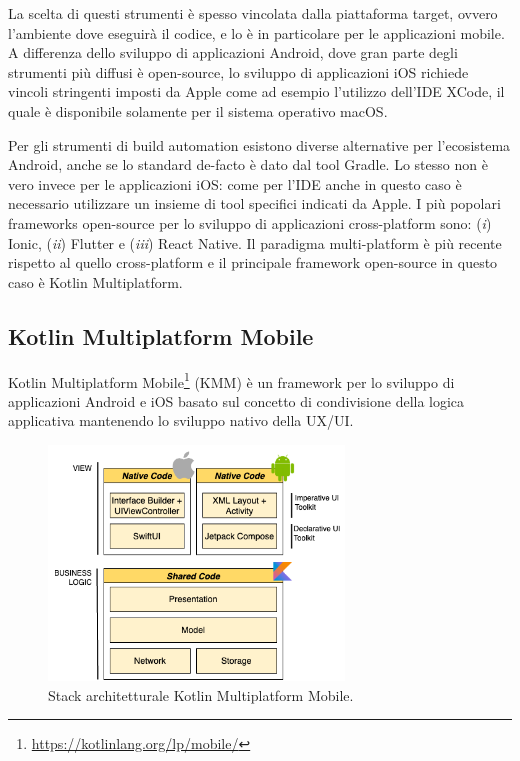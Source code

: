 La scelta di questi strumenti è spesso vincolata dalla piattaforma target, ovvero l'ambiente dove eseguirà il codice, e lo è in particolare per le applicazioni mobile. A differenza dello sviluppo di applicazioni Android, dove gran parte degli strumenti più diffusi è open-source, lo sviluppo di applicazioni iOS richiede vincoli stringenti imposti da Apple come ad esempio l'utilizzo dell'IDE XCode, il quale è disponibile solamente per il sistema operativo macOS.

Per gli strumenti di build automation esistono diverse alternative per l'ecosistema Android, anche se lo standard de-facto è dato dal tool Gradle. Lo stesso non è vero invece per le applicazioni iOS: come per l'IDE anche in questo caso è necessario utilizzare un insieme di tool specifici indicati da Apple. I più popolari frameworks open-source per lo sviluppo di applicazioni cross-platform sono: (\textit{i}) Ionic, (\textit{ii}) Flutter e (\textit{iii}) React Native. Il paradigma multi-platform è più recente rispetto al quello cross-platform e il principale framework open-source in questo caso è Kotlin Multiplatform.

\subsection{Kotlin Multiplatform Mobile}
Kotlin Multiplatform Mobile\footnote{\href{https://kotlinlang.org/lp/mobile/}{https://kotlinlang.org/lp/mobile/}} (KMM) è un framework per lo sviluppo di applicazioni Android e iOS basato sul concetto di condivisione della logica applicativa mantenendo lo sviluppo nativo della UX/UI.

\begin{figure}[H]
    \centering
    \includegraphics[width=0.7\textwidth]{img/stack_kmm.png}
    \caption{Stack architetturale Kotlin Multiplatform Mobile.}
    \label{stackKMM}
\end{figure}

